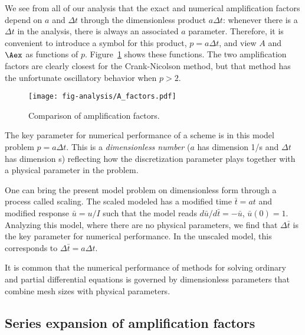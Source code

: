 \documentclass[graybox,sectrefs,envcountresetchap,open=right,final]{svmonodo}
\newenvironment{notice_mdfboxadmon}[1][]{
\begin{notice_mdfboxmdframed}[frametitle=#1]
}
{
\end{notice_mdfboxmdframed}
}
\begin{document}
We see from all of our analysis
that the exact and numerical amplification factors depend
on $a$ and $\Delta t$ through the dimensionless
product $a\Delta t$: whenever there is a
$\Delta t$ in the analysis, there is always an associated $a$
parameter. Therefore, it
is convenient to introduce a symbol for this product, $p=a\Delta t$,
and view $A$ and $\Aex$ as functions of $p$. Figure~\ref{decay:analysis:fig:A} shows these functions. The two amplification
factors are clearly closest for the
Crank-Nicolson method, but that method has
the unfortunate oscillatory behavior when $p>2$.

\begin{figure}[!ht]  %
  \centerline{\texttt{[image: fig-analysis/A\_factors.pdf]}}
  \caption{
  Comparison of amplification factors. \label{decay:analysis:fig:A}
  }
\end{figure}


\begin{notice_mdfboxadmon}[Significance of the $p=a\Delta t$ parameter]
The key parameter for numerical performance of a scheme is in this model
problem $p=a\Delta t$. This is a \emph{dimensionless number} ($a$ has dimension
1/s and $\Delta t$ has dimension s) reflecting how the discretization
parameter plays together with a physical parameter in the problem.

One can bring the present model problem on dimensionless form
through a process called scaling. The scaled modeled has a modified
time $\bar t = at$ and modified response $\bar u =u/I$ such that
the model reads $d\bar u/d\bar t = -\bar u$, $\bar u(0)=1$.
Analyzing this model, where there are no physical parameters,
we find that $\Delta \bar t$ is the key parameter
for numerical performance. In the unscaled model,
this corresponds to $\Delta \bar t = a\Delta t$.

It is common that the numerical performance of methods for solving ordinary and
partial differential equations is governed by dimensionless parameters
that combine mesh sizes with physical parameters.
\end{notice_mdfboxadmon} %



\subsection{Series expansion of amplification factors}
\end{document}
